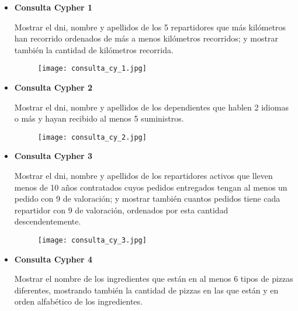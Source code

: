 \documentclass[a4paper]{article}
\begin{document}
\begin{itemize}

    \item \textbf{\large{Consulta Cypher 1}}

        Mostrar el dni, nombre y apellidos de los 5 repartidores que más kilómetros han recorrido ordenados de más a menos kilómetros recorridos; y mostrar también la cantidad de kilómetros recorrida.
        
    \begin{figure}[H]
        \centering
        \texttt{[image: consulta\_cy\_1.jpg]}
        \label{fig:consulta_cy_1}
    \end{figure}

    \vspace{1cm}
    
    \item \textbf{\large{Consulta Cypher 2}}

        Mostrar el dni, nombre y apellidos de los dependientes que hablen 2 idiomas o más y hayan recibido al menos 5 suministros.
        
    \begin{figure}[H]
        \centering
        \texttt{[image: consulta\_cy\_2.jpg]}
        \label{fig:consulta_cy_2}
    \end{figure}

    \newpage
    
    \item \textbf{\large{Consulta Cypher 3}}

        Mostrar el dni, nombre y apellidos de los repartidores activos que lleven menos de 10 años contratados cuyos pedidos entregados tengan al menos un pedido con 9 de valoración; y mostrar también cuantos pedidos tiene cada repartidor con 9 de valoración, ordenados por esta cantidad descendentemente.
        
    \begin{figure}[H]
        \centering
        \texttt{[image: consulta\_cy\_3.jpg]}
        \label{fig:consulta_cy_3}
    \end{figure}

    \vspace{1cm}
    
    \item \textbf{\large{Consulta Cypher 4}}

        Mostrar el nombre de los ingredientes que están en al menos 6 tipos de pizzas diferentes, mostrando también la cantidad de pizzas en las que están y en orden alfabético de los ingredientes.
        

\end{itemize}
\end{document}
